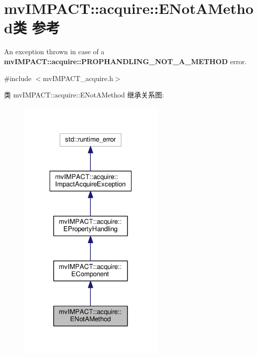 \hypertarget{classmv_i_m_p_a_c_t_1_1acquire_1_1_e_not_a_method}{\section{mv\+I\+M\+P\+A\+C\+T\+:\+:acquire\+:\+:E\+Not\+A\+Method类 参考}
\label{classmv_i_m_p_a_c_t_1_1acquire_1_1_e_not_a_method}
}


An exception thrown in case of a {\bfseries mv\+I\+M\+P\+A\+C\+T\+::acquire\+::\+P\+R\+O\+P\+H\+A\+N\+D\+L\+I\+N\+G\+\_\+\+N\+O\+T\+\_\+\+A\+\_\+\+M\+E\+T\+H\+O\+D} error.  




{\ttfamily \#include $<$mv\+I\+M\+P\+A\+C\+T\+\_\+acquire.\+h$>$}



类 mv\+I\+M\+P\+A\+C\+T\+:\+:acquire\+:\+:E\+Not\+A\+Method 继承关系图\+:
\nopagebreak
\begin{figure}[H]
\begin{center}
\leavevmode
\includegraphics[width=202pt]{classmv_i_m_p_a_c_t_1_1acquire_1_1_e_not_a_method__inherit__graph}
\end{center}
\end{figure}


